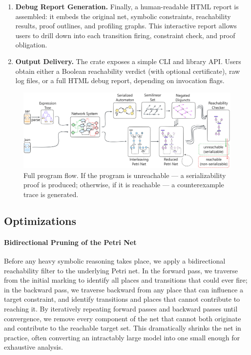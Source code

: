 \begin{enumerate}
	\item \textbf{Debug Report Generation.} Finally, a human-readable HTML report is assembled: it embeds the original net, symbolic constraints, reachability results, proof outlines, and profiling graphs. This interactive report allows users to drill down into each transition firing, constraint check, and proof obligation.
	
	\item \textbf{Output Delivery.} The crate exposes a simple CLI and library API. Users obtain either a Boolean reachability verdict (with optional certificate), raw log files, or a full HTML debug report, depending on invocation flags.
\end{enumerate}



\begin{figure}[htbp]
	\centering
	\includegraphics[width=1.0\textwidth]{plots/full_program_flow.pdf}
	\caption{Full program flow. If the program is unreachable --- a serializability proof is produced; otherwise, if it is reachable --- a counterexample trace is generated.}
	\label{fig:full_program_flow}
\end{figure}


\subsection{Optimizations}

\paragraph{Bidirectional Pruning of the Petri Net}
Before any heavy symbolic reasoning takes place, we apply a bidirectional reachability filter to the underlying Petri net.  In the forward pass, we traverse from the initial marking to identify all places and transitions that could ever fire; in the backward pass, we traverse backward from any place that can influence a target constraint, and identify transitions and places that cannot contribute to reaching it.  By iteratively repeating forward passes and backward passes until convergence, we remove every component of the net that cannot both originate and contribute to the reachable target set.  This dramatically shrinks the net in practice, often converting an intractably large model into one small enough for exhaustive analysis.

